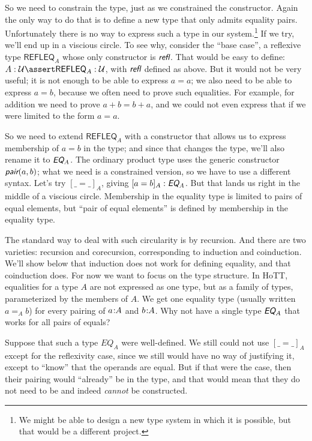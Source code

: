 \documentclass{article}
\begin{document}
So we need to constrain the type, just as we constrained the
constructor. Again the only way to do that is to define a new type
that only admits equality pairs. Unfortunately there is no way to
express such a type in our system.\footnote{We might be able to design
a new type system in which it is possible, but that would be a
different project.} If we try, we'll end up in a viscious circle. To
see why, consider the ``base case'', a reflexive type
\(\textsf{REFLEQ}_A\) whose only constructor is \(\refl\). That
would be easy to define: \(A:\Univ\linfer \textsf{REFLEQ}_A:\Univ\),
with \(\refl\) defined as above. But it would not be very useful; it
is not enough to be able to express \(a=a\); we also need to be able
to express \(a=b\), because we often need to prove such equalities.
For example, for addition we need to prove \(a+b = b+a\), and we could
not even express that if we were limited to the form \(a=a\).

So we need to extend \(\textsf{REFLEQ}_A\) with a constructor that
allows us to express membership of \(a=b\) in the type; and since that
changes the type, we'll also rename it to \(\EQ_A\). The ordinary
product type uses the generic constructor \(\pair(a,b)\); what we need
is a constrained version, so we have to use a different syntax. Let's
try \([\_=\_]_A\), giving \([a=b]_A:\EQ_A\). But that lands us right
in the middle of a viscious circle. Membership in the equality type is
limited to pairs of equal elements, but ``pair of equal elements'' is
defined by membership in the equality type.

The standard way to deal with such circularity is by recursion. And
there are two varieties: recursion and corecursion, corresponding to
induction and coinduction. We'll show below that induction does not
work for defining equality, and that coinduction does. For now we want
to focus on the type structure. In HoTT, equalities for a type \(A\)
are not expressed as one type, but as a family of types, parameterized
by the members of \(A\). We get one equality type (usually written
\(a=_A b\)) for every pairing of \(a\hspace{-2pt}:\hspace{-3pt} A\) and \(b\hspace{-2pt}:\hspace{-3pt} A\). Why not
have a single type \(\EQ_A\) that works for all pairs of equals?

Suppose that such a type \(EQ_A\) were well-defined. We still could
not use \([\_=\_]_A\) except for the reflexivity case, since we still
would have no way of justifying it, except to ``know'' that the
operands are equal. But if that were the case, then their pairing
would ``already'' be in the type, and that would mean that they do not
need to be and indeed \textit{cannot} be constructed.
\end{document}
